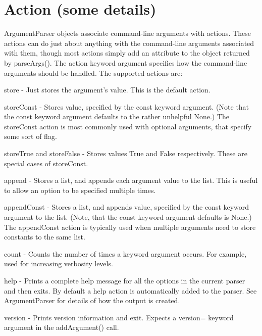 \section*{Action (some details) }

Argument\+Parser objects associate command-\/line arguments with actions. These actions can do just about anything with the command-\/line arguments associated with them, though most actions simply add an attribute to the object returned by parse\+Args(). The action keyword argument specifies how the command-\/line arguments should be handled. The supported actions are\+:


\begin{DoxyItemize}
\item {\ttfamily store} -\/ Just stores the argument’s value. This is the default action.
\item {\ttfamily store\+Const} -\/ Stores value, specified by the const keyword argument. (Note that the const keyword argument defaults to the rather unhelpful None.) The \textquotesingle{}store\+Const\textquotesingle{} action is most commonly used with optional arguments, that specify some sort of flag.
\item {\ttfamily store\+True} and {\ttfamily store\+False} -\/ Stores values True and False respectively. These are special cases of \textquotesingle{}store\+Const\textquotesingle{}.
\item {\ttfamily append} -\/ Stores a list, and appends each argument value to the list. This is useful to allow an option to be specified multiple times.
\item {\ttfamily append\+Const} -\/ Stores a list, and appends value, specified by the const keyword argument to the list. (Note, that the const keyword argument defaults is None.) The \textquotesingle{}append\+Const\textquotesingle{} action is typically used when multiple arguments need to store constants to the same list.
\item {\ttfamily count} -\/ Counts the number of times a keyword argument occurs. For example, used for increasing verbosity levels.
\item {\ttfamily help} -\/ Prints a complete help message for all the options in the current parser and then exits. By default a help action is automatically added to the parser. See Argument\+Parser for details of how the output is created.
\item {\ttfamily version} -\/ Prints version information and exit. Expects a {\ttfamily version=} keyword argument in the add\+Argument() call.
\end{DoxyItemize}

